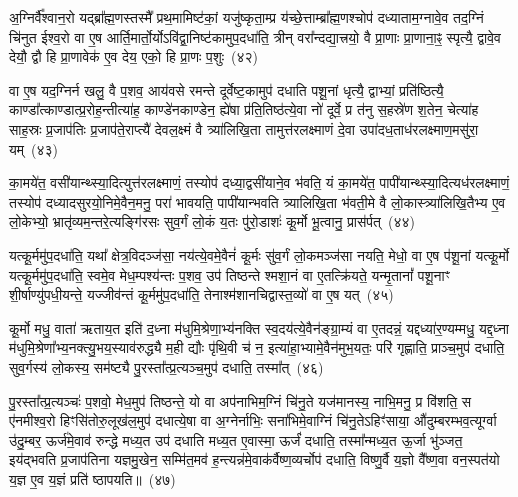 अ॒ग्निर्वै᳚श्वान॒रो यद्ब्रा᳚ह्म॒णस्तस्मै᳚ प्रथ॒मामिष्ट॑कां॒ यजु॑ष्कृता॒म्प्र य॑च्छे॒त्ताम्ब्रा᳚ह्म॒णश्चोप॑ दध्याताम॒ग्नावे॒व तद॒ग्निं चि॑नुत ईश्व॒रो वा ए॒ष आर्ति॒मार्तो॒र्यो\-ऽवि॑द्वा॒निष्ट॑कामुप॒दधा॑ति॒ त्रीन् वरा᳚न्दद्या॒त्त्रयो॒ वै प्रा॒णाः प्रा॒णाना॒ꣴ॒ स्पृत्यै॒ द्वावे॒व देयौ॒ द्वौ हि प्रा॒णावेक॑ ए॒व देय॒ एको॒ हि प्रा॒णः प॒शुः~(४२)

वा ए॒ष यद॒ग्निर्न खलु॒ वै प॒शव॒ आय॑वसे रमन्ते दूर्वेष्ट॒कामुप॑ दधाति पशू॒नां धृत्यै॒ द्वाभ्यां॒ प्रति॑ष्ठित्यै॒ काण्डा᳚त्काण्डात्प्र॒रोह॒न्तीत्या॑ह॒ काण्डे॑नकाण्डेन॒ ह्ये॑षा प्र॑ति॒तिष्ठ॑त्ये॒वा नो॑ दूर्वे॒ प्र त॑नु स॒हस्रे॑ण श॒तेन॒ चेत्या॑ह साह॒स्रः प्र॒जाप॑तिः प्र॒जाप॑ते॒राप्त्यै॑ देवल॒क्ष्मं वै त्र्या॑लिखि॒ता तामुत्त॑रलक्ष्माणं दे॒वा उपा॑दध॒ताध॑रलक्ष्माण॒मसु॑रा॒ यम्~(४३)

का॒मये॑त॒ वसी॑यान्थ्स्या॒दित्युत्त॑रलक्ष्माणं॒ तस्योप॑ दध्या॒द्वसी॑याने॒व भ॑वति॒ यं का॒मये॑त॒ पापी॑यान्थ्स्या॒दित्यध॑र\-लक्ष्माणं॒ तस्योप॑ दध्यादसुरयो॒निमे॒वैन॒मनु॒ परा॑ भावयति॒ पापी॑यान्भवति त्र्यालिखि॒ता भ॑वती॒मे वै लो॒का\-स्त्र्या॑लिखि॒तैभ्य ए॒व लो॒केभ्यो॒ भ्रातृ॑व्यम॒न्तरे॒त्यङ्गि॑रसः सुव॒र्गं लो॒कं य॒तः पु॑रो॒डाशः॑ कू॒र्मो भू॒त्वानु॒ प्रास॑र्पत्~(४४)

यत्कू॒र्ममु॑प॒दधा॑ति॒ यथा᳚ क्षेत्र॒विदञ्ज॑सा॒ नय॑त्ये॒वमे॒वैनं॑ कू॒र्मः सु॑व॒र्गं लो॒कमञ्ज॑सा नयति॒ मेधो॒ वा ए॒ष प॑शू॒नां यत्कू॒र्मो यत्कू॒र्ममु॑प॒दधा॑ति॒ स्वमे॒व मेध॒म्पश्य॑न्तः प॒शव॒ उप॑ तिष्ठन्ते श्मशा॒नं वा ए॒तत्क्रि॑यते॒ यन्मृ॒तानां᳚ पशू॒नाꣳ शी॒र्\mbox{}षाण्यु॑पधी॒यन्ते॒ यज्जीव॑न्तं कू॒र्ममु॑प॒दधा॑ति॒ तेनाश्म॑शानचिद्वास्त॒व्यो॑ वा ए॒ष यत्~(४५)

कू॒र्मो मधु॒ वाता॑ ऋताय॒त इति॑ द॒ध्ना म॑धुमि॒श्रेणा॒भ्य॑नक्ति स्व॒दय॑त्ये॒वैन॑ङ्ग्रा॒म्यं वा ए॒तदन्नं॒ यद्दध्या॑र॒ण्यम्मधु॒ यद्द॒ध्ना म॑धुमि॒श्रेणा᳚भ्य॒नक्त्यु॒भय॒स्याव॑रुद्ध्यै म॒ही द्यौः पृ॑थि॒वी च॑ न॒ इत्या॑हा॒भ्यामे॒वैन॑मुभ॒यतः॒ परि॑ गृह्णाति॒ प्राञ्च॒मुप॑ दधाति॒ सुव॒र्गस्य॑ लो॒कस्य॒ सम॑ष्ट्यै पु॒रस्ता᳚त्प्र॒त्यञ्च॒मुप॑ दधाति॒ तस्मा᳚त्~(४६)

पु॒रस्ता᳚त्प्र॒त्यञ्चः॑ प॒शवो॒ मेध॒मुप॑ तिष्ठन्ते॒ यो वा अप॑नाभिम॒ग्निं चि॑नु॒ते यज॑मानस्य॒ नाभि॒मनु॒ प्र वि॑शति॒ स ए॑नमीश्व॒रो हिꣳसि॑तोरु॒लूख॑ल॒मुप॑ दधात्ये॒षा वा अ॒ग्नेर्नाभिः॒ सना॑भिमे॒वाग्निं चि॑नु॒ते\-ऽहिꣳ॑साया॒ औ॑दुम्बरम्भव॒त्यूर्ग्वा उ॑दु॒म्बर॒ ऊर्ज॑मे॒वाव॑ रुन्द्धे मध्य॒त उप॑ दधाति मध्य॒त ए॒वास्मा॒ ऊर्जं॑ दधाति॒ तस्मा᳚न्मध्य॒त ऊ॒र्जा भु॑ञ्जत॒ इय॑द्भवति प्र॒जाप॑तिना यज्ञमु॒खेन॒ सम्मि॑त॒मव॑ ह॒न्त्यन्न॑मे॒वाक॑र्वैष्ण॒व्यर्चोप॑ दधाति॒ विष्णु॒र्वै य॒ज्ञो वै᳚ष्ण॒वा वन॒स्पत॑यो य॒ज्ञ ए॒व य॒ज्ञं प्रति॑ ष्ठापयति॥~(४७)

{\anuvakamend[{ए॒ष वै प॒शुर्यम॑सर्पदे॒ष यत्तस्मा॒त्तस्मा᳚थ्स॒प्तविꣳ॑शतिश्च}]}%

